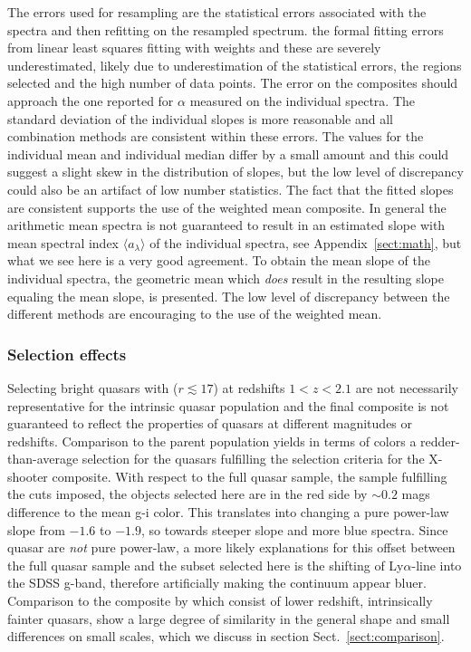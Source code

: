 \documentclass{aa}    %
\newcommand{\sectionname}{Sect.}
\newcommand{\Sect}[1]{\sectionname~\ref{sect:#1}}
\newcommand{\sect}[1]{\Sect{#1}}
\newcommand{\App}[1]{Appendix~\ref{sect:#1}}
\newcommand{\app}[1]{\App{#1}}
\newcommand{\sectlabel}[1]{\label{sect:#1}}
\newcommand{\lya}{Ly$\alpha$}
\begin{document}
{{The errors used for resampling  are the statistical errors associated with the spectra and then refitting on the resampled spectrum. the formal fitting errors from linear least squares fitting with weights and these are severely underestimated, likely due to underestimation of the statistical errors, the regions selected and the high number of data points. The error on the composites should approach the one reported for $\alpha$ measured on the individual spectra. The standard deviation of the individual slopes is more reasonable and all combination methods are consistent within these errors. The values for the individual mean and individual median differ by a small amount and this could suggest a slight skew in the distribution of slopes, but the low level of discrepancy could also be an artifact of low number statistics. The fact that the fitted slopes are consistent supports the use of the weighted mean composite.
}
In general the arithmetic mean spectra is not guaranteed to result in an estimated slope with mean spectral index $\langle a_\lambda\rangle$ of the individual spectra, see \app{math}, but what we see here is a very good agreement. To obtain the mean slope of the individual spectra, the geometric mean which \textit{does} result in the resulting slope equaling the mean slope, is presented. The low level of discrepancy between the different methods are encouraging to the use of the weighted mean.

\subsubsection{Selection effects}  \sectlabel{Selection effects}
Selecting bright quasars with ($r \lesssim 17$) at redshifts $1 < z < 2.1$ are not necessarily representative for the intrinsic quasar population \citep{Paris2014} and the final composite is not guaranteed to reflect the properties of quasars at different magnitudes or redshifts. Comparison to the parent population yields in terms of colors a redder-than-average selection for the quasars fulfilling the selection criteria for the X-shooter composite. With respect to the full quasar sample, the sample fulfilling the cuts imposed, the objects selected here are in the red side by $\sim 0.2$ mags difference to the mean g-i color. This translates into changing a pure power-law slope from $-1.6$ to $-1.9$, so towards steeper slope and more blue spectra. Since quasar are \textit{not} pure power-law, a more likely explanations for this offset between the full quasar sample and the subset selected here is the shifting of \lya-line into the SDSS g-band, therefore artificially making the continuum appear bluer.
Comparison to the composite by \citet{VandenBerk2001} which consist of lower redshift, intrinsically fainter quasars, show a large degree of similarity in the general shape and small differences on small scales, which we discuss in section \sect{comparison}. 


}
\end{document}
